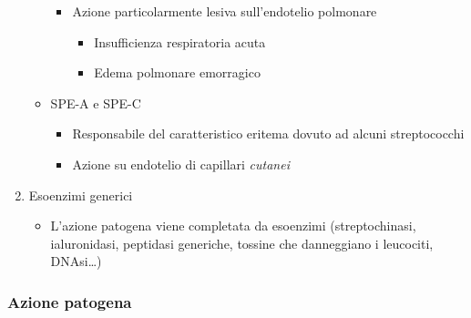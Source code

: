 \documentclass[italian,]{article}
\providecommand{\tightlist}{%
  \setlength{\itemsep}{0pt}\setlength{\parskip}{0pt}}
\begin{document}
\begin{enumerate}
\begin{itemize}
    \begin{itemize}
    \tightlist
    \item
      Azione particolarmente lesiva sull'endotelio polmonare

      \begin{itemize}
      \tightlist
      \item
        Insufficienza respiratoria acuta
      \item
        Edema polmonare emorragico
      \end{itemize}
    \end{itemize}
  \item
    SPE-A e SPE-C

    \begin{itemize}
    \tightlist
    \item
      Responsabile del caratteristico eritema dovuto ad alcuni
      streptococchi
    \item
      Azione su endotelio di capillari \emph{cutanei}
    \end{itemize}
  \end{itemize}
\item
  Esoenzimi generici

  \begin{itemize}
  \tightlist
  \item
    L'azione patogena viene completata da esoenzimi (streptochinasi,
    ialuronidasi, peptidasi generiche, tossine che danneggiano i
    leucociti, DNAsi\ldots{})
  \end{itemize}
\end{enumerate}

\hypertarget{azione-patogena-1}{%
\subsubsection{Azione patogena}\label{azione-patogena-1}}
\end{document}
